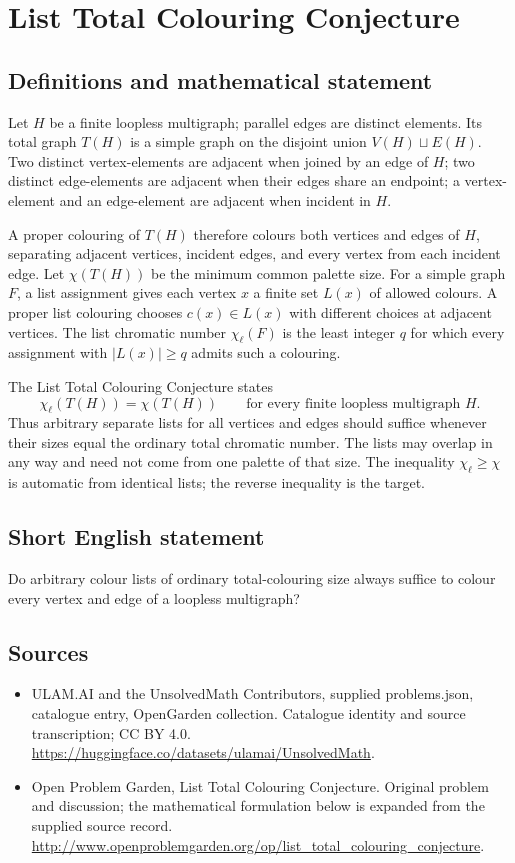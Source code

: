 \documentclass[11pt,a4paper]{article}
\begin{document}
\section*{List Total Colouring Conjecture}\label{statement}

\subsection{Definitions and mathematical statement}
Let $H$ be a finite loopless multigraph; parallel
edges are distinct elements. Its total graph
$T(H)$ is a simple graph on the disjoint union
$V(H)\sqcup E(H)$. Two distinct vertex-elements
are adjacent when joined by an edge of $H$;
two distinct edge-elements are adjacent when
their edges share an endpoint; a vertex-element
and an edge-element are adjacent when incident
in $H$.

A proper colouring of $T(H)$ therefore colours
both vertices and edges of $H$, separating
adjacent vertices, incident edges, and every
vertex from each incident edge. Let
$\chi(T(H))$ be the minimum common palette size.
For a simple graph $F$, a list assignment gives
each vertex $x$ a finite set $L(x)$ of allowed
colours. A proper list colouring chooses
$c(x)\in L(x)$ with different choices at
adjacent vertices. The list chromatic number
$\chi_\ell(F)$ is the least integer $q$ for
which every assignment with $|L(x)|\geq q$
admits such a colouring.

The List Total Colouring Conjecture states
\[
 \chi_\ell(T(H))=\chi(T(H))
 \qquad\text{for every finite loopless multigraph }H.
\]
Thus arbitrary separate lists for all vertices
and edges should suffice whenever their sizes
equal the ordinary total chromatic number.
The lists may overlap in any way and need not
come from one palette of that size. The inequality
$\chi_\ell\geq\chi$ is automatic from identical
lists; the reverse inequality is the target.
\subsection{Short English statement}
Do arbitrary colour lists of ordinary total-colouring size always suffice to colour every vertex and edge of a loopless multigraph?
\subsection{Sources}
\begin{itemize}
\item[S1] ULAM.AI and the UnsolvedMath Contributors, supplied problems.json, catalogue entry, OpenGarden collection. Catalogue identity and source transcription; CC BY 4.0.
\url{https://huggingface.co/datasets/ulamai/UnsolvedMath}.
\item[S2] Open Problem Garden, List Total Colouring Conjecture. Original problem and discussion; the mathematical formulation below is expanded from the supplied source record.
\url{http://www.openproblemgarden.org/op/list_total_colouring_conjecture}.
\end{itemize}
\end{document}
